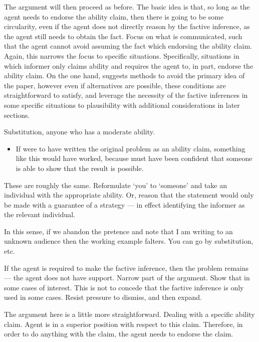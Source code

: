 \documentclass[10pt]{article}
\begin{document}
The argument will then proceed as before.
{
  \color{red}
  The basic idea is that, so long as the agent needs to endorse the ability claim, then there is going to be some circularity, even if the agent does not directly reason by the factive inference, as the agent still needs to obtain the fact.
}
Focus on what is communicated, such that the agent cannot avoid assuming the fact which endorsing the ability claim.
Again, this narrows the focus to specific situations.
Specifically, situations in which informer only claims ability and requires the agent to, in part, endorse the ability claim.
On the one hand, suggests methods to avoid the primary idea of the paper, however even if alternatives are possible, these conditions are straightforward to satisfy, and leverage the necessity of the factive inferences in some specific situations to plausibility with additional considerations in later sections.






\begin{note}[Substitution]
  Substitution, anyone who has a moderate ability.
  \begin{itemize}
  \item If \citeauthor{Emms:2000aa} were to have written the original problem as an ability claim, something like this would have worked, because \citeauthor{Emms:2000aa} must have been confident that someone is able to show that the result is possible.
  \end{itemize}

  These are roughly the same.
  Reformulate `you' to `someone' and take an individual with the appropriate ability.
  Or, reason that the statement would only be made with a guarantee of a strategy --- in effect identifying the informer as the relevant individual.

  In this sense, if we abandon the pretence and note that I am writing to an unknown audience then the working example falters.
  You can go by substitution, etc.

  If the agent is required to make the factive inference, then the problem remains --- the agent does not have support.
  Narrow part of the argument.
  Show that in some cases of interest.
  This is not to concede that the factive inference is only used in some cases.
  Resist pressure to dismiss, and then expand.
\end{note}

The argument here is a little more straightforward.
Dealing with a specific ability claim.
Agent is in a superior position with respect to this claim.
Therefore, in order to do anything with the claim, the agent needs to endorse the claim.
\end{document}

